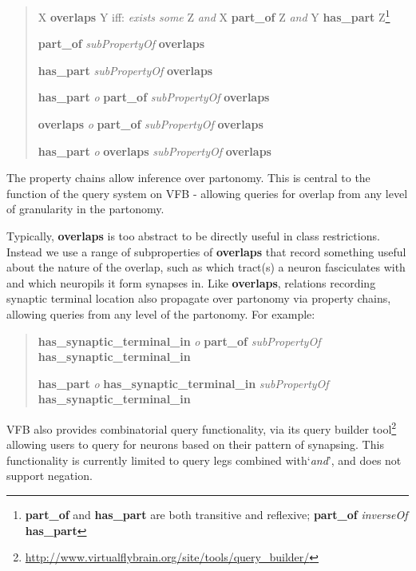 \documentclass[runningheads,a4paper]{llncs}
\begin{document}
\begin{quote}
X \textbf{overlaps} Y iff: \textit{exists some} Z \textit{and}
X \textbf{part\_of} Z \textit{and} Y \textbf{has\_part}
Z\footnote{\textbf{part\_of} and \textbf{has\_part} are both
  transitive and reflexive; \textbf{part\_of} \textit{inverseOf}
  \textbf{has\_part}}

\textbf{part\_of} \textit{subPropertyOf}
  \textbf{overlaps}

\textbf{has\_part} \textit{subPropertyOf} \textbf{overlaps}

\textbf{has\_part} \textit{o} \textbf{part\_of} \textit{subPropertyOf}
\textbf{overlaps}

\textbf{overlaps} \textit{o} \textbf{part\_of} \textit{subPropertyOf} \textbf{overlaps}

\textbf{has\_part} \textit{o} \textbf{overlaps} \textit{subPropertyOf} \textbf{overlaps}\end{quote}

The property chains allow inference over partonomy.  This is central
to the function of the query system on VFB - allowing queries for
overlap from any level of granularity in the partonomy.

Typically, \textbf{overlaps} is too abstract to be directly useful in
class restrictions. Instead we use a range of subproperties of
\textbf{overlaps} that record something useful about the nature of the
overlap, such as which tract(s) a neuron fasciculates with and which
neuropils it form synapses in.  Like \textbf{overlaps}, relations
recording synaptic terminal location also propagate over partonomy via
property chains, allowing queries from any level of the partonomy.
For example:

\begin{quote}
\textbf{has\_synaptic\_terminal\_in} \textit{o} \textbf{part\_of} \textit{subPropertyOf} \textbf{has\_synaptic\_terminal\_in}

\textbf{has\_part} \textit{o} \textbf{has\_synaptic\_terminal\_in} \textit{subPropertyOf}
\textbf{has\_synaptic\_terminal\_in}
\end{quote}
 
VFB also provides combinatorial query functionality, via its
query builder tool\footnote{\url{http://www.virtualflybrain.org/site/tools/query_builder/}}
allowing users to query for neurons based on their pattern of
synapsing.  This functionality is currently limited to query legs
combined with`\textit {and}', and does not support negation.

\end{document}
